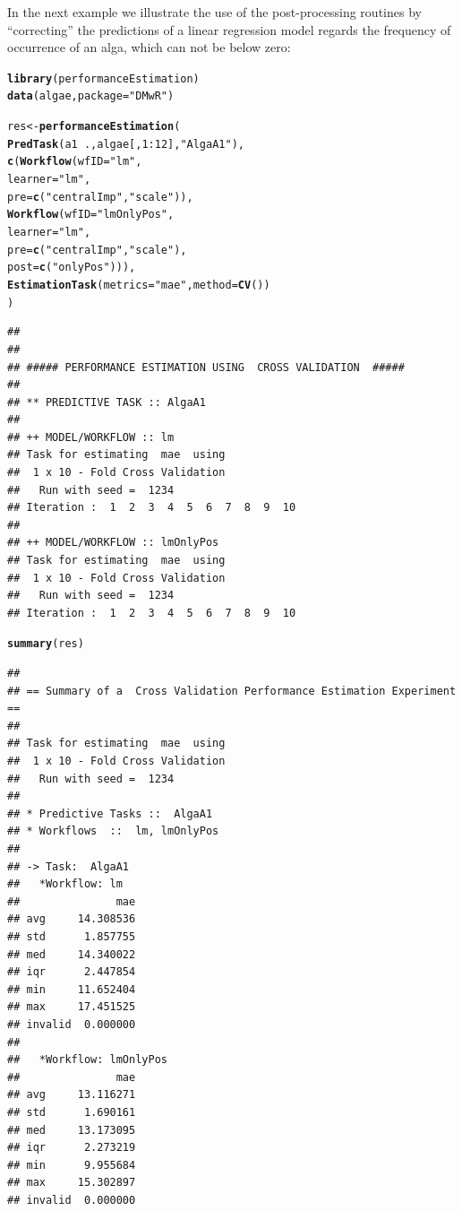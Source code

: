\documentclass[10pt,a4paper]{article}\usepackage[]{graphicx}\usepackage[]{color}
\makeatletter
\newcommand{\hlnum}[1]{\textcolor[rgb]{0.686,0.059,0.569}{#1}}%
\newcommand{\hlstr}[1]{\textcolor[rgb]{0.192,0.494,0.8}{#1}}%
\newcommand{\hlopt}[1]{\textcolor[rgb]{0,0,0}{#1}}%
\newcommand{\hlstd}[1]{\textcolor[rgb]{0.345,0.345,0.345}{#1}}%
\newcommand{\hlkwb}[1]{\textcolor[rgb]{0.69,0.353,0.396}{#1}}%
\newcommand{\hlkwc}[1]{\textcolor[rgb]{0.333,0.667,0.333}{#1}}%
\newcommand{\hlkwd}[1]{\textcolor[rgb]{0.737,0.353,0.396}{\textbf{#1}}}%
\newenvironment{kframe}{%
 \def\at@end@of@kframe{}%
 \ifinner\ifhmode%
  \def\at@end@of@kframe{\end{minipage}}%
  \begin{minipage}{\columnwidth}%
 \fi\fi%
 \def\FrameCommand##1{\hskip\@totalleftmargin \hskip-\fboxsep
 \colorbox{shadecolor}{##1}\hskip-\fboxsep
     \hskip-\linewidth \hskip-\@totalleftmargin \hskip\columnwidth}%
 \MakeFramed {\advance\hsize-\width
   \@totalleftmargin\z@ \linewidth\hsize
   \@setminipage}}%
 {\par\unskip\endMakeFramed%
 \at@end@of@kframe}
\newenvironment{knitrout}{}{} %
\makeatother
\begin{document}
In the next example we illustrate the use of the post-processing routines by ``correcting'' the predictions of a linear regression model regards the frequency of occurrence of an alga, which can not be below zero:

\begin{knitrout}\footnotesize
{}\color{fgcolor}\begin{kframe}
\begin{alltt}
\hlkwd{library}\hlstd{(performanceEstimation)}
\hlkwd{data}\hlstd{(algae,}\hlkwc{package}\hlstd{=}\hlstr{"DMwR"}\hlstd{)}

\hlstd{res} \hlkwb{<-} \hlkwd{performanceEstimation}\hlstd{(}
         \hlkwd{PredTask}\hlstd{(a1} \hlopt{~} \hlstd{.,algae[,}\hlnum{1}\hlopt{:}\hlnum{12}\hlstd{],}\hlstr{"AlgaA1"}\hlstd{),}
         \hlkwd{c}\hlstd{(}\hlkwd{Workflow}\hlstd{(}\hlkwc{wfID}\hlstd{=}\hlstr{"lm"}\hlstd{,}
                    \hlkwc{learner}\hlstd{=}\hlstr{"lm"}\hlstd{,}
                    \hlkwc{pre}\hlstd{=}\hlkwd{c}\hlstd{(}\hlstr{"centralImp"}\hlstd{,}\hlstr{"scale"}\hlstd{)),}
           \hlkwd{Workflow}\hlstd{(}\hlkwc{wfID}\hlstd{=}\hlstr{"lmOnlyPos"}\hlstd{,}
                    \hlkwc{learner}\hlstd{=}\hlstr{"lm"}\hlstd{,}
                    \hlkwc{pre}\hlstd{=}\hlkwd{c}\hlstd{(}\hlstr{"centralImp"}\hlstd{,}\hlstr{"scale"}\hlstd{),}
                    \hlkwc{post}\hlstd{=}\hlkwd{c}\hlstd{(}\hlstr{"onlyPos"}\hlstd{))),}
         \hlkwd{EstimationTask}\hlstd{(}\hlkwc{metrics}\hlstd{=}\hlstr{"mae"}\hlstd{,}\hlkwc{method}\hlstd{=}\hlkwd{CV}\hlstd{())}
         \hlstd{)}
\end{alltt}
\begin{verbatim}
## 
## 
## ##### PERFORMANCE ESTIMATION USING  CROSS VALIDATION  #####
## 
## ** PREDICTIVE TASK :: AlgaA1
## 
## ++ MODEL/WORKFLOW :: lm 
## Task for estimating  mae  using
##  1 x 10 - Fold Cross Validation
## 	 Run with seed =  1234 
## Iteration :  1  2  3  4  5  6  7  8  9  10
## 
## ++ MODEL/WORKFLOW :: lmOnlyPos 
## Task for estimating  mae  using
##  1 x 10 - Fold Cross Validation
## 	 Run with seed =  1234 
## Iteration :  1  2  3  4  5  6  7  8  9  10
\end{verbatim}
\begin{alltt}
\hlkwd{summary}\hlstd{(res)}
\end{alltt}
\begin{verbatim}
## 
## == Summary of a  Cross Validation Performance Estimation Experiment ==
## 
## Task for estimating  mae  using
##  1 x 10 - Fold Cross Validation
## 	 Run with seed =  1234 
## 
## * Predictive Tasks ::  AlgaA1
## * Workflows  ::  lm, lmOnlyPos 
## 
## -> Task:  AlgaA1
##   *Workflow: lm 
##               mae
## avg     14.308536
## std      1.857755
## med     14.340022
## iqr      2.447854
## min     11.652404
## max     17.451525
## invalid  0.000000
## 
##   *Workflow: lmOnlyPos 
##               mae
## avg     13.116271
## std      1.690161
## med     13.173095
## iqr      2.273219
## min      9.955684
## max     15.302897
## invalid  0.000000
\end{verbatim}
\end{kframe}
\end{knitrout}
\end{document}
